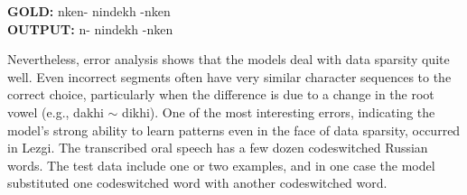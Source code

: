 \pex   
\label{ex:alaserrors}
\a \textbf{GOLD:} \hspace{2mm} n\textlangle{}\textrangle{}ken- \hspace{1mm} nindekh \hspace{1mm} -n\textlangle{}\textrangle{}ken \\
\textbf{OUTPUT:} \hspace{2mm} n- \hspace{5mm} nindekh \hspace{2mm} -n\textlangle{}\textrangle{}ken
\xe



Nevertheless, error analysis shows that the models deal with data sparsity quite well. Even incorrect segments often have very similar character sequences to the correct choice, particularly when the difference is due to a change in the root vowel (e.g., dakhi $\sim$ dikhi). One of the most interesting errors, indicating the model's strong ability to learn patterns even in the face of data sparsity, occurred in Lezgi. The transcribed oral speech has a few dozen codeswitched Russian words. The test data include one or two examples, and in one case the model substituted one codeswitched word with another codeswitched word. 

